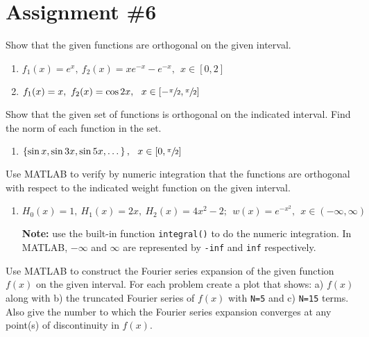 \chapter{Assignment \#6}
\label{ch:ass6}
\begin{fullwidth}

Show that the given functions are orthogonal on the given interval.
\begin{enumerate}
\item $f_1(x) = e^{x}, \ f_2(x)=xe^{-x}-e^{-x}, \ \ x\in[0,2]$

\vspace{1.0cm}

\item $f_1(x) = x, \ f_2(x)=\cos{2x}, \ \ x\in\left[-\sfrac{\pi}{2},\sfrac{\pi}{2}\right]$
\end{enumerate}

\vspace{1.50cm}

\noindent Show that the given set of functions is orthogonal on the indicated interval.  Find the norm of each function in the set.
\begin{enumerate}[resume]
\item $\left\{\sin{x},\sin{3x},\sin{5x},\dots \right\}, \ \ x\in\left[0,\sfrac{\pi}{2}\right]$

\end{enumerate}

\vspace{1.5cm}

\noindent Use MATLAB to verify by numeric integration that the functions are orthogonal with respect to the indicated weight function on the given interval.

\begin{enumerate}[resume]
\item $H_0(x) = 1, \ H_1(x) = 2x, \ H_2(x)=4x^2-2; \ \ w(x)=e^{-x^2}, \ \ x\in(-\infty,\infty)$

\noindent\textbf{Note:} use the built-in function \lstinline{integral()} to do the numeric integration.  In MATLAB, $-\infty$ and $\infty$ are represented by \lstinline{-inf} and \lstinline{inf} respectively.
\end{enumerate}


\vspace{1.5cm}

\noindent Use MATLAB to construct the Fourier series expansion of the given function $f(x)$ on the given interval.  For each problem create a plot that shows: a) $f(x)$ along with b) the truncated Fourier series of $f(x)$ with \lstinline{N=5} and c) \lstinline{N=15} terms.  Also give the number to which the Fourier series expansion converges at any point(s) of discontinuity in $f(x)$. 


\end{fullwidth}
